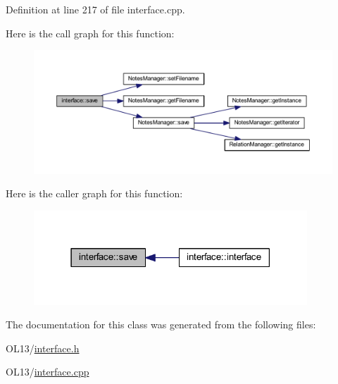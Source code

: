Definition at line 217 of file interface.\+cpp.

Here is the call graph for this function\+:\nopagebreak
\begin{figure}[H]
\begin{center}
\leavevmode
\includegraphics[width=350pt]{classinterface_a319f133949e2be97a203f725c3f1e565_cgraph}
\end{center}
\end{figure}
Here is the caller graph for this function\+:\nopagebreak
\begin{figure}[H]
\begin{center}
\leavevmode
\includegraphics[width=291pt]{classinterface_a319f133949e2be97a203f725c3f1e565_icgraph}
\end{center}
\end{figure}


The documentation for this class was generated from the following files\+:\begin{DoxyCompactItemize}
\item 
O\+L13/\hyperlink{interface_8h}{interface.\+h}\item 
O\+L13/\hyperlink{interface_8cpp}{interface.\+cpp}\end{DoxyCompactItemize}
